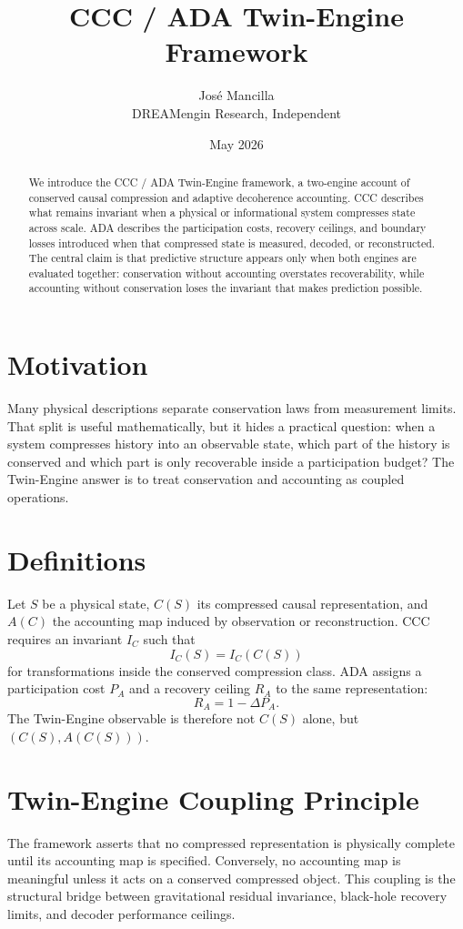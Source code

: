 \documentclass[11pt]{article}
\title{CCC / ADA Twin-Engine Framework}
\author{José Mancilla\\DREAMengin Research, Independent}
\date{May 2026}
\begin{document}
\maketitle

\begin{abstract}
We introduce the CCC / ADA Twin-Engine framework, a two-engine account of conserved causal compression and adaptive decoherence accounting. CCC describes what remains invariant when a physical or informational system compresses state across scale. ADA describes the participation costs, recovery ceilings, and boundary losses introduced when that compressed state is measured, decoded, or reconstructed. The central claim is that predictive structure appears only when both engines are evaluated together: conservation without accounting overstates recoverability, while accounting without conservation loses the invariant that makes prediction possible.
\end{abstract}

\section{Motivation}
Many physical descriptions separate conservation laws from measurement limits. That split is useful mathematically, but it hides a practical question: when a system compresses history into an observable state, which part of the history is conserved and which part is only recoverable inside a participation budget? The Twin-Engine answer is to treat conservation and accounting as coupled operations.

\section{Definitions}
Let $S$ be a physical state, $C(S)$ its compressed causal representation, and $A(C)$ the accounting map induced by observation or reconstruction. CCC requires an invariant $I_C$ such that
\begin{equation}
I_C(S) = I_C(C(S))
\end{equation}
for transformations inside the conserved compression class. ADA assigns a participation cost $P_A$ and a recovery ceiling $R_A$ to the same representation:
\begin{equation}
R_A = 1 - \Delta P_A.
\end{equation}
The Twin-Engine observable is therefore not $C(S)$ alone, but $(C(S), A(C(S)))$.

\section{Twin-Engine Coupling Principle}
The framework asserts that no compressed representation is physically complete until its accounting map is specified. Conversely, no accounting map is meaningful unless it acts on a conserved compressed object. This coupling is the structural bridge between gravitational residual invariance, black-hole recovery limits, and decoder performance ceilings.
\end{document}
